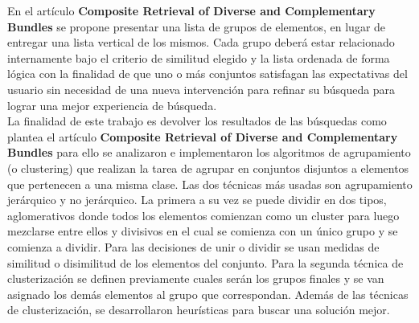En el  artículo \textbf{Composite Retrieval of Diverse and Complementary Bundles}\cite{compositeRetrival} se propone presentar una lista de grupos de elementos, en lugar de entregar una lista vertical de los mismos. Cada grupo deberá estar relacionado internamente bajo el criterio de similitud elegido y la lista ordenada de forma lógica con la finalidad de que uno o más conjuntos satisfagan las expectativas del usuario sin necesidad de una nueva intervención para refinar su búsqueda para lograr una mejor experiencia de búsqueda.\\
La finalidad de este trabajo es devolver los resultados de las búsquedas como plantea el artículo \textbf{Composite Retrieval of Diverse and Complementary Bundles} para ello se analizaron e implementaron los algoritmos de agrupamiento (o clustering) que realizan la tarea de agrupar en conjuntos disjuntos a elementos que pertenecen a una misma clase. Las dos técnicas más usadas son agrupamiento jerárquico y no jerárquico. La primera a su vez se puede dividir en dos tipos, aglomerativos donde todos los elementos comienzan como un cluster para luego mezclarse entre ellos y divisivos en el cual se comienza con un único grupo y se comienza a dividir. Para las decisiones de unir o dividir se usan medidas de similitud o disimilitud de los elementos del conjunto. Para la segunda técnica de clusterización se definen previamente cuales serán los grupos finales y se van asignado los demás elementos al grupo que correspondan. Además de las técnicas de clusterización, se desarrollaron heurísticas para buscar una solución mejor.\\
